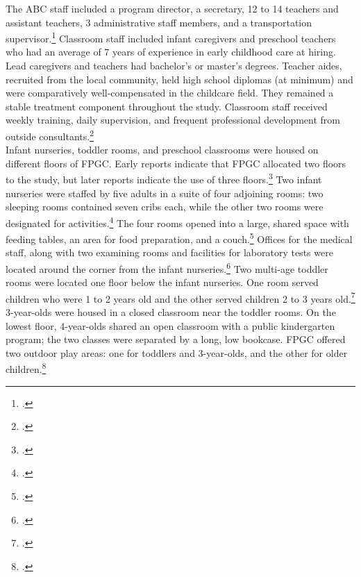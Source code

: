 \begin{appendices}
\noindent The ABC staff included a program director, a secretary, 12 to 14 teachers and assistant teachers, 3 administrative staff members, and a transportation supervisor.\footnote{\citet{Ramey-et-al_1977_Intro-to-ABC,Ramey_McGinness_etal_1982_Abecedarianapproach}.} Classroom staff included infant caregivers and preschool teachers who had an average of 7 years of experience in early childhood care at hiring. Lead caregivers and teachers had bachelor's or master's degrees. Teacher aides, recruited from the local community, held high school diplomas (at minimum) and were comparatively well-compensated in the childcare field. They remained a stable treatment component throughout the study. Classroom staff received weekly training, daily supervision, and frequent professional development from outside consultants.\footnote{\citet{Obrien-Sanders_1974_ABC-brochure,Sanders-Stokes_1979_Status-Report,Klein-Sanders_1982_Status-Report,abc2014-2015interviews}.}\\

\noindent Infant nurseries, toddler rooms, and preschool classrooms were housed on different floors of FPGC. Early reports indicate that FPGC allocated two floors to the study, but later reports indicate the use of three floors.\footnote{\citet{Ramey_Smith_1977_AJMD,Ramey_Campbell_1979_SR,Ramey_1981_Modification}.} Two infant nurseries were staffed by five adults in a suite of four adjoining rooms: two sleeping rooms contained seven cribs each, while the other two rooms were designated for activities.\footnote{ \citet{Ramey-et-al_1977_Intro-to-ABC}.} The four rooms opened into a large, shared space with feeding tables, an area for food preparation, and a couch.\footnote{\citet{Ramey_Campbell_1979_SR}.} Offices for the medical staff, along with two examining rooms and facilities for laboratory tests were located around the corner from the infant nurseries.\footnote{\citet{abc2014-2015interviews}.} Two multi-age toddler rooms were located one floor below the infant nurseries. One room served children who were 1 to 2 years old and the other served children 2 to 3 years old.\footnote{\citet{Ramey_Smith_1977_AJMD,Ramey_Campbell_1979_SR}.} 3-year-olds were housed in a closed classroom near the toddler rooms. On the lowest floor, 4-year-olds shared an open classroom with a public kindergarten program; the two classes were separated by a long, low bookcase. FPGC offered two outdoor play areas: one for toddlers and 3-year-olds, and the other for older children.\footnote{\citet{Ramey_Campbell_1979_SR,Ramey_McGinness_etal_1982_Abecedarianapproach}.}\\


\end{appendices}
